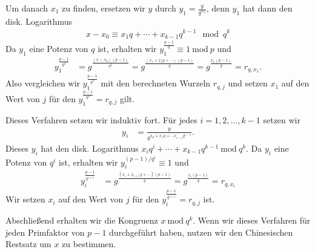 \documentclass[
  a4paper,
  11pt,
]{scrartcl}
\theoremstyle{plain}
\theoremstyle{definition}
\theoremstyle{remark}
\newcommand{\Mod}[1]{\ \mathrm{mod}\ #1}
\begin{document}
Um danach $x_1$ zu finden, ersetzen wir $y$ durch $y_1 = \frac{y}{g^{x_0}}$,
denn $y_1$ hat dann den disk. Logarithmus
\begin{align*}
  x - x_0 \equiv x_1 q + \cdots + x_{k-1} q^{k-1} \mod q^k
\end{align*}
Da $y_1$ eine Potenz von $q$ ist, erhalten wir
$y_1^{\frac{p-1}{q}} \equiv 1 \Mod{p}$ und
\begin{align*}
  y_1^{\frac{p-1}{q^2}} &
    = g^{\frac{(x-x_0) (p-1)}{q^2}}
    = g^{\frac{(x_1 + x_2 q + \cdots) (p-1)}{q}}
    = g^{\frac{x_1 (p-1)}{q}}
    = r_{q, x_1}.
\end{align*}
Also vergleichen wir $y_1^{\frac{p-1}{q^2}}$ mit den berechneten Wurzeln
$r_{q, j}$ und setzen $x_1$ auf den Wert von $j$ für den
$y_1^{\frac{p-1}{q^2}} = r_{q, j}$ gilt.

Dieses Verfahren setzen wir induktiv fort. Für jedes $i = 1, 2, \ldots, k-1$
setzen wir
\begin{align*}
  y_i & = \frac{y}{g^{x_0 + x_1 q + \cdots x_{i-1} q^{i-1}}}.
\end{align*}
Dieses $y_i$ hat den disk. Logarithmus
$x_i q^i + \cdots + x_{k-1} q^{k-1} \Mod{q^k}$. Da $y_i$ eine Potenz von $q^i$
ist, erhalten wir $y_i^{(p-1)/q^i} \equiv 1$ und
\begin{align*}
  y_i^{\frac{p-1}{q^{i+1}}} &
    = g^{\frac{(x_i + x_{i+1} q + \cdots) (p-1)}{q}}
    = g^{\frac{x_i (p-1)}{q}}
    = r_{q, x_i}
\end{align*}
Wir setzen $x_i$ auf den Wert von $j$ für den
$y_i^{\frac{p-1}{q^{i+1}}} = r_{q, j}$ ist.

Abschließend erhalten wir die Kongruenz $x \Mod{q^k}$. Wenn wir dieses Verfahren
für jeden Primfaktor von $p-1$ durchgeführt haben, nutzen wir den Chinesischen
Restsatz um $x$ zu bestimmen.
\end{document}
